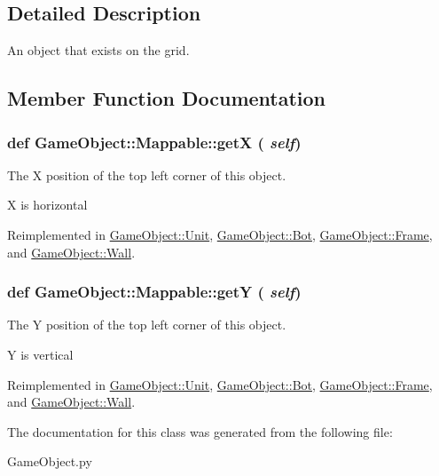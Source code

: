 \subsection{Detailed Description}
An object that exists on the grid. 

\subsection{Member Function Documentation}
\hypertarget{classGameObject_1_1Mappable_a3ae7d302c87c0a6f1e211a7584c3b807}{
\subsubsection[{getX}]{\setlength{\rightskip}{0pt plus 5cm}def GameObject::Mappable::getX ( {\em self})}}
\label{classGameObject_1_1Mappable_a3ae7d302c87c0a6f1e211a7584c3b807}


The X position of the top left corner of this object. 

X is horizontal 

Reimplemented in \hyperlink{classGameObject_1_1Unit_a01711efd87c7e3e2a97066e9a5c50da5}{GameObject::Unit}, \hyperlink{classGameObject_1_1Bot_a76521d97d7dcce093efbdd1926c75750}{GameObject::Bot}, \hyperlink{classGameObject_1_1Frame_aab513e4859fc8a9f5d5f1a6b47cb6df3}{GameObject::Frame}, and \hyperlink{classGameObject_1_1Wall_aa8d092fd75ef8372aacf4ece64521ea8}{GameObject::Wall}.

\hypertarget{classGameObject_1_1Mappable_af7b558a1be2dc80d1aa78f306e226c10}{
\subsubsection[{getY}]{\setlength{\rightskip}{0pt plus 5cm}def GameObject::Mappable::getY ( {\em self})}}
\label{classGameObject_1_1Mappable_af7b558a1be2dc80d1aa78f306e226c10}


The Y position of the top left corner of this object. 

Y is vertical 

Reimplemented in \hyperlink{classGameObject_1_1Unit_a4d0c47deb0ddb19b9e2b195d8ca2f2ad}{GameObject::Unit}, \hyperlink{classGameObject_1_1Bot_a5e193704cae24529a6e6f00fd9a1447f}{GameObject::Bot}, \hyperlink{classGameObject_1_1Frame_abf564d6f986b8e9d2a83838691c591f9}{GameObject::Frame}, and \hyperlink{classGameObject_1_1Wall_ac87b620714dfacc5ac12ca6078a91460}{GameObject::Wall}.



The documentation for this class was generated from the following file:\begin{DoxyCompactItemize}
\item 
GameObject.py\end{DoxyCompactItemize}
